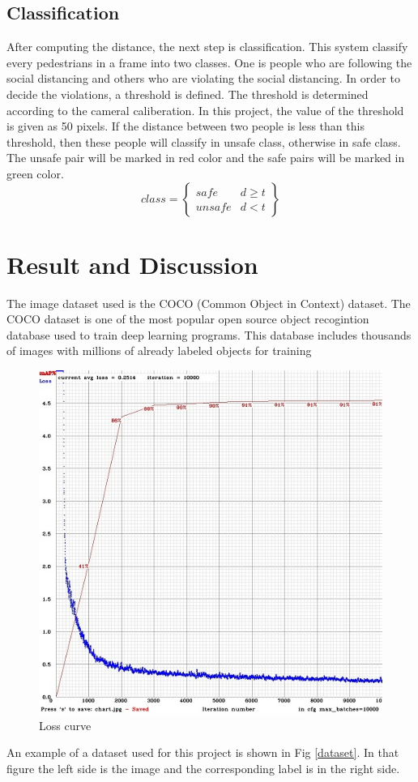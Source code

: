 \documentclass[conference]{IEEEtran}
\begin{document}
\subsection{Classification}
After computing the distance, the next step is classification. This system classify every pedestrians in a frame into two classes. One is people who are following the social distancing and others who are violating the social distancing. In order to decide the violations, a threshold is defined. The threshold is determined according to the cameral caliberation. In this project, the value of the threshold is given as 50 pixels. If the distance between two people is less than this threshold, then these people will classify in unsafe class, otherwise in safe class. The unsafe pair will be marked in red color and the safe pairs will be marked in green color. 
\begin{equation}
	class = \left\{
	\begin{array}{ll}
		safe & d \ge t \\
		unsafe & d < t
	\end{array}
	\right\}
\end{equation}



\section{Result and Discussion}
The image dataset used is the COCO (Common Object in Context) dataset. The COCO dataset is one of the most popular open source object recogintion database used to train deep learning programs. This database includes thousands of images with millions of already labeled objects for training
\begin{figure}[!h]
	\includegraphics[width=\columnwidth]{./images/loss.jpeg}
	\caption{Loss curve}
	\label{loss}
\end{figure}
An example of a dataset used for this project is shown in Fig \ref{dataset}. In that figure the left side is the image and the corresponding label is in the right side. 
 
\end{document}
